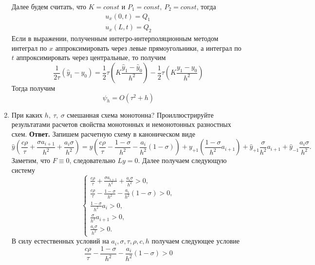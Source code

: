 \documentclass{article}
\begin{document}
\begin{enumerate}
		Далее будем считать, что $K = const$ и $P_1 = const, \ P_2 = const$, тогда 
		\begin{gather*}
			u_x (0, t) = Q_1 \\ 
			u_x (L, t) = Q_2 
		\end{gather*}
		Если в выражении, полученным интегро-интерполяционным методом 
		интеграл по $x$ аппроксимировать через левые прямоугольники, а 
		интеграл по $t$ аппроксимировать через центральные, то получим 
		\begin{equation*}
			\frac{1}{2\tau}(\hat{y}_{1}-  y_0) = \frac{1}{2}\tau (K \frac{\hat{y}_1
			- \hat{y}_0}{h^2}) -  \frac{1}{2}\tau (K \frac{y_1
			- y_0}{h^2})
		\end{equation*}
		Тогда получим 
		\begin{equation*}
			\psi_h = O(\tau^2 + h)
		\end{equation*}
		\item При каких $h, \ \tau, \ \sigma$ смешанная схема монотонна? Проиллюстрируйте результатами расчетов свойства монотонных
		и немонотонных разностных схем.
		\newline
		{\bfseries Ответ. } 
		Запишем расчетную схему в каноническом виде 
		\begin{equation*}
			\hat{y} (\frac{c \rho }{\tau} + \frac{\sigma a_{i+1}}{h^2} + \frac{a_i \sigma}{h^2}) 
			= y \left(\frac{c \rho}{\tau}- \frac{1-\sigma}{h^2} - \frac{a_i}{h^2}(1-\sigma)\right) 
			+ y_{+1} \left(\frac{1-\sigma}{h^2}a_{i+1}\right) + \hat{y}_{+1} \frac{\sigma}{h^2} a_{i+1}
			+ \hat{y}_{-1} \frac{a_i \sigma}{h^2}.
		\end{equation*}
		Заметим, что $F \equiv 0$, следовательно $Ly = 0$.
		Далее получаем следующую систему 
		\begin{equation*}
			\begin{cases}
				\frac{c \rho }{\tau} + \frac{\sigma a_{i+1}}{h^2} + \frac{a_i \sigma}{h^2} > 0, \\ 
				\frac{c \rho}{\tau}- \frac{1-\sigma}{h^2} - \frac{a_i}{h^2}(1-\sigma) > 0, \\
				\frac{1-\sigma}{h^2} a_i > 0, \\ 
				\frac{\sigma}{h^2} a_{i+1} > 0, \\ 
				\frac{a_i \sigma}{h^2} > 0.
			\end{cases}
		\end{equation*}
		В силу естественных условий на $a_i, \sigma, \tau, \rho, c, h$ получаем следующее условие 
		\begin{equation*}
			\frac{c \rho}{\tau}- \frac{1-\sigma}{h^2} - \frac{a_i}{h^2}(1-\sigma) > 0

\end{equation*}
\end{enumerate}
\end{document}
